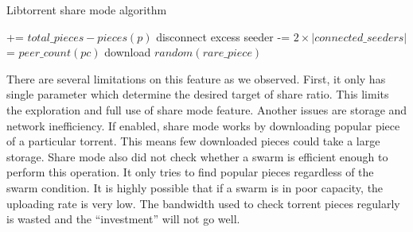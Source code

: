 \begin{algorithm}[]
	\caption{Libtorrent share mode algorithm}
	\label{alg:ltsharemode}
	\begin{algorithmic}[1]
		\Statex
		 += {$total\_pieces - pieces(p)$} \label{alg:l_lts:missingp}
		\EndIf	
		\EndFor
		\State disconnect excess seeder \label{alg:l_lts:disconnectpeers}
		\EndIf
		 -= {$2 \times |connected\_seeders|$}	\label{alg:l_lts:reducemissing}	
		\State \Return
		\EndIf
		 \label{alg:l_lts:retdlenough}
		\State \Return
		\EndIf
		 \label{alg:l_lts:retdling}
		\State \Return
		\EndIf
			\label{alg:l_lts:rarepc}
		 = {$peer\_count(pc)$} 
		\EndIf	
		\EndFor
		 \label{alg:l_lts:rareunable}
		\State \Return
		\EndIf
		\State download {$random(rare\_piece)$} \label{alg:l_lts:dlrare}
	\end{algorithmic}
\end{algorithm}

There are several limitations on this feature as we observed. First, it only has single parameter which determine the desired target of share ratio. This limits the exploration and full use of share mode feature. Another issues are storage and network inefficiency. If enabled, share mode works by downloading popular piece of a particular torrent. This means few downloaded pieces could take a large storage. Share mode also did not check whether a swarm is efficient enough to perform this operation. It only tries to find popular pieces regardless of the swarm condition. It is highly possible that if a swarm is in poor capacity, the uploading rate is very low. The bandwidth used to check torrent pieces regularly is wasted and the ``investment'' will not go well.